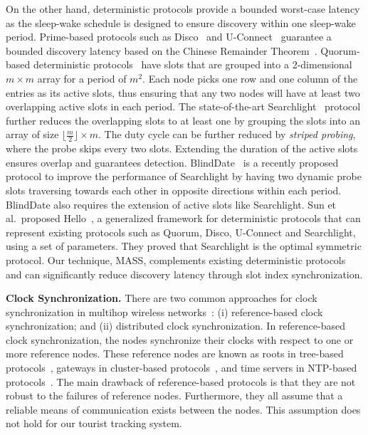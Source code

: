 \documentclass[twoside,twocolumn]{article}
\begin{document}
On the other hand, deterministic protocols provide a bounded worst-case latency as the sleep-wake 
schedule is designed to ensure discovery within one sleep-wake period. Prime-based protocols such 
as Disco~\citep{Dutta2008Practical} and U-Connect~\citep{kandhalu2010u} guarantee a bounded discovery 
latency based on the Chinese Remainder Theorem~\citep{niven2008introduction}. Quorum-based 
deterministic protocols~\citep{tseng2003power,lai2010heterogenous} have slots that are grouped into 
a 2-dimensional $m \times m$ array for a period of $m^2$.  Each node picks one row and one column 
of the entries as its active slots, thus ensuring that any two nodes will have at least two overlapping 
active slots in each period. The state-of-the-art Searchlight~\citep{bakht2012searchlight} protocol 
further reduces the overlapping slots to at least one by grouping the slots into an array of size 
$\lfloor\frac{m}{2}\rfloor \times m$. The duty cycle can be further reduced by {\em striped probing}, 
where the probe skips every two slots. Extending the duration of the active slots ensures overlap
and guarantees detection.  BlindDate~\citep{wang13blinddate} is a recently proposed protocol to 
improve the performance of Searchlight by having two dynamic probe slots traversing towards each other 
in opposite directions within each period. BlindDate also requires the extension of active slots like 
Searchlight.  Sun et al.\ proposed Hello~\citep{sun14hello}, a generalized framework for deterministic
protocols that can represent existing protocols such as Quorum, Disco, U-Connect and Searchlight, using 
a set of parameters.  They proved that Searchlight is the optimal symmetric protocol. Our technique,
MASS, complements existing deterministic protocols and can significantly reduce discovery latency 
through slot index synchronization.

{\bf Clock Synchronization.} There are two common approaches for clock synchronization in multihop 
wireless networks~\citep{sun14survey}: (i) reference-based clock synchronization; and (ii) distributed 
clock synchronization. In reference-based clock synchronization, the nodes synchronize their clocks 
with respect to one or more reference nodes. These reference nodes are known as roots in tree-based
protocols~\citep{su2005time,ganeriwal2003timing}, gateways in cluster-based protocols~\citep{elson2002fine}, 
and time servers in NTP-based protocols~\citep{ye2008dtp}. The main drawback of reference-based protocols 
is that they are not robust to the failures of reference nodes. Furthermore, they all assume that a 
reliable means of communication exists between the nodes.  This assumption does not hold for our tourist 
tracking system.
\end{document}
